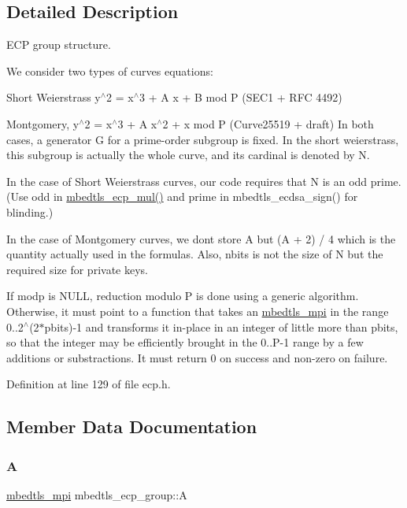 \subsection{Detailed Description}
E\+CP group structure. 

We consider two types of curves equations\+:
\begin{DoxyEnumerate}
\item Short Weierstrass y$^\wedge$2 = x$^\wedge$3 + A x + B mod P (S\+E\+C1 + R\+FC 4492)
\item Montgomery, y$^\wedge$2 = x$^\wedge$3 + A x$^\wedge$2 + x mod P (Curve25519 + draft) In both cases, a generator G for a prime-\/order subgroup is fixed. In the short weierstrass, this subgroup is actually the whole curve, and its cardinal is denoted by N.
\end{DoxyEnumerate}

In the case of Short Weierstrass curves, our code requires that N is an odd prime. (Use odd in \mbox{\hyperlink{ecp_8h_a4d005045c302e100c78bdc587e8f0e6a}{mbedtls\+\_\+ecp\+\_\+mul()}} and prime in mbedtls\+\_\+ecdsa\+\_\+sign() for blinding.)

In the case of Montgomery curves, we don\textquotesingle{}t store A but (A + 2) / 4 which is the quantity actually used in the formulas. Also, nbits is not the size of N but the required size for private keys.

If modp is N\+U\+LL, reduction modulo P is done using a generic algorithm. Otherwise, it must point to a function that takes an \mbox{\hyperlink{structmbedtls__mpi}{mbedtls\+\_\+mpi}} in the range 0..2$^\wedge$(2$\ast$pbits)-\/1 and transforms it in-\/place in an integer of little more than pbits, so that the integer may be efficiently brought in the 0..P-\/1 range by a few additions or substractions. It must return 0 on success and non-\/zero on failure. 

Definition at line 129 of file ecp.\+h.



\subsection{Member Data Documentation}
\mbox{\label{structmbedtls__ecp__group_af6ab87eb277c78f786ca58ed3fd78825}} 
\subsubsection{\texorpdfstring{A}{A}}
{\footnotesize\ttfamily \mbox{\hyperlink{structmbedtls__mpi}{mbedtls\+\_\+mpi}} mbedtls\+\_\+ecp\+\_\+group\+::A}


